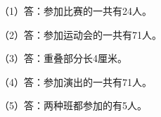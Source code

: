
\begingroup\color{answerred}\noindent（1）答：参加比赛的一共有24人。\par
\noindent（2）答：参加运动会的一共有71人。\par
\noindent（3）答：重叠部分长4厘米。\par
\noindent（4）答：参加演出的一共有71人。\par
\noindent（5）答：两种班都参加的有5人。\par\par\endgroup
